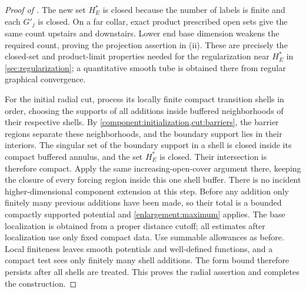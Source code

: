 \begin{proof}[Proof of ]
The new set $H_E^*$ is closed because the number of labels is finite and
each $G'_j$ is closed.  On a far collar, exact product prescribed open sets give the
same count upstairs and downstairs.  Lower end base dimension weakens the
required count, proving the projection assertion in (ii).  These are
precisely the closed-set and product-limit properties needed for the
regularization near $H_E^*$ in \cref{sec:regularization}; a quantitative
smooth tube is obtained there from regular graphical convergence.

For the initial radial cut, process its locally finite compact
transition shells in order, choosing the supports of all additions
inside buffered neighborhoods of their respective shells.
By \cref{component:initialization,cut:barriers}, the barrier regions
separate these neighborhoods, and the boundary support lies in
their interiors.  The singular set of the boundary support in a shell is closed inside its compact buffered
annulus, and the set $H_E^*$ is closed.  Their intersection is therefore
compact.  Apply the same increasing-open-cover argument there, keeping
the closure of every forcing region inside this one shell buffer.
There is no incident higher-dimensional component extension at this step.  Before any addition only
finitely many previous additions have
been made, so their total is a bounded compactly supported potential
and \cref{enlargement:maximum} applies.  The base localization is obtained
from a proper distance cutoff; all estimates after localization use
only fixed compact data.  Use summable allowances as before.  Local
finiteness leaves smooth potentials and well-defined functions, and a
compact test sees only finitely many shell additions.  The form bound
therefore persists after all shells are treated.  This proves the
radial assertion and completes the construction.
\end{proof}
